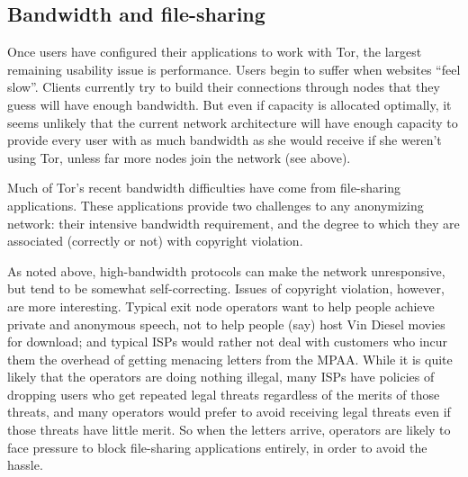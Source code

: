 \documentclass{llncs}
\begin{document}


\subsection{Bandwidth and file-sharing}
\label{subsec:bandwidth-and-file-sharing}
Once users have configured their applications to work with Tor, the largest
remaining usability issue is performance.  Users begin to suffer
when websites ``feel slow''.
Clients currently try to build their connections through nodes that they
guess will have enough bandwidth.  But even if capacity is allocated
optimally, it seems unlikely that the current network architecture will have
enough capacity to provide every user with as much bandwidth as she would
receive if she weren't using Tor, unless far more nodes join the network
(see above).


Much of Tor's recent bandwidth difficulties have come from file-sharing
applications.  These applications provide two challenges to
any anonymizing network: their intensive bandwidth requirement, and the
degree to which they are associated (correctly or not) with copyright
violation.

As noted above, high-bandwidth protocols can make the network unresponsive,
but tend to be somewhat self-correcting.  Issues of copyright violation,
however, are more interesting.  Typical exit node operators want to help
people achieve private and anonymous speech, not to help people (say) host
Vin Diesel movies for download; and typical ISPs would rather not
deal with customers who incur them the overhead of getting menacing letters
from the MPAA\@.  While it is quite likely that the operators are doing nothing
illegal, many ISPs have policies of dropping users who get repeated legal
threats regardless of the merits of those threats, and many operators would
prefer to avoid receiving legal threats even if those threats have little
merit.  So when the letters arrive, operators are likely to face
pressure to block file-sharing applications entirely, in order to avoid the
hassle.
\end{document}
